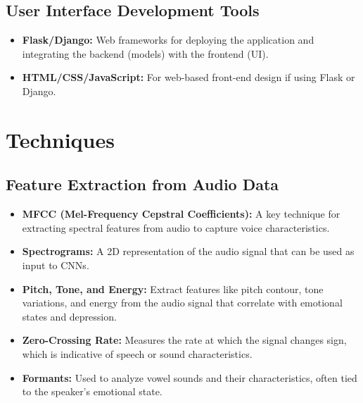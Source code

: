 \subsection{User Interface Development Tools}
\begin{itemize}
    \item \textbf{Flask/Django:} Web frameworks for deploying the application and integrating the backend (models) with the frontend (UI).
    \item \textbf{HTML/CSS/JavaScript:} For web-based front-end design if using Flask or Django.
\end{itemize}

\section{Techniques}

\subsection{Feature Extraction from Audio Data}
\begin{itemize}
    \item \textbf{MFCC (Mel-Frequency Cepstral Coefficients):} A key technique for extracting spectral features from audio to capture voice characteristics.
    \item \textbf{Spectrograms:} A 2D representation of the audio signal that can be used as input to CNNs.
    \item \textbf{Pitch, Tone, and Energy:} Extract features like pitch contour, tone variations, and energy from the audio signal that correlate with emotional states and depression.
    \item \textbf{Zero-Crossing Rate:} Measures the rate at which the signal changes sign, which is indicative of speech or sound characteristics.
    \item \textbf{Formants:} Used to analyze vowel sounds and their characteristics, often tied to the speaker's emotional state.
\end{itemize}

